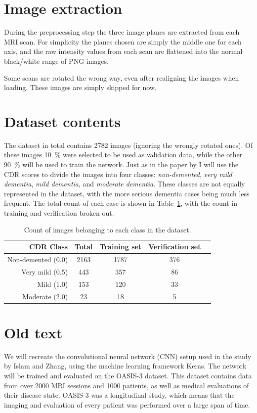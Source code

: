 \documentclass{kththesis}
\begin{document}
\section{Image extraction}
During the preprocessing step the three image planes are extracted from each MRI scan. For simplicity the planes chosen are simply the middle one for each axis, and the raw intensity values from each scan are flattened into the normal black/white range of PNG images.

Some scans are rotated the wrong way, even after realigning the images when loading. These images are simply skipped for now.

\section{Dataset contents}
The dataset in total contains 2782 images (ignoring the wrongly rotated ones). Of these images 10~\% were selected to be used as validation data, while the other 90~\% will be used to train the network. Just as in the paper by \textcite{islam2018early} I will use the CDR scores to divide the images into four classes: \textit{non-demented}, \textit{very mild dementia}, \textit{mild dementia}, and \textit{moderate dementia}. These classes are not equally represented in the dataset, with the more serious dementia cases being much less frequent. The total count of each case is shown in Table~\ref{tab:dataset_contents}, with the count in training and verification broken out.

\begin{table}[h]
  \begin{center}
    \caption{Count of images belonging to each class in the dataset.\label{tab:dataset_contents}}
    \begin{tabular}{r|cccc}
      \textbf{CDR Class} & \textbf{Total} & \textbf{Training set} & \textbf{Verification set} \\
      \toprule
      Non-demented (0.0) & 2163 & 1787 & 376 \\
      Very mild (0.5) & 443 & 357 & 86 \\
      Mild (1.0) & 153 & 120 & 33 \\
      Moderate (2.0) & 23 & 18 & 5 \\
    \end{tabular}
  \end{center}
\end{table}

\section{Old text}
We will recreate the convolutional neural network (CNN) setup used in the study by Islam and Zhang, using the machine learning framework Keras. The network will be trained and evaluated on the OASIS-3 dataset. This dataset contains data from over 2000 MRI sessions and 1000 patients, as well as medical evaluations of their disease state. OASIS-3 was a longitudinal study, which means that the imaging and evaluation of every patient was performed over a large span of time.
\end{document}
